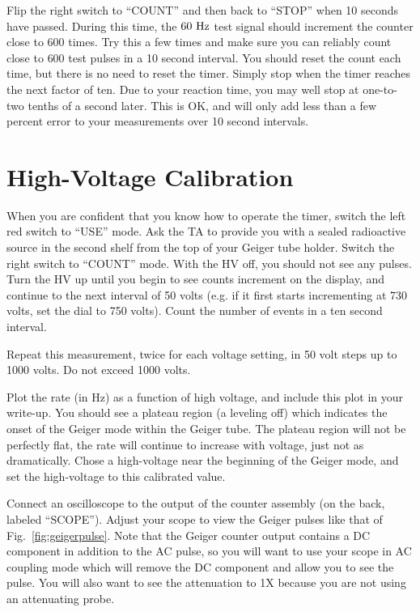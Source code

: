 \documentclass[12pt]{article}
\begin{document}
Flip the right switch to ``COUNT'' and then back to ``STOP'' when 10
seconds have passed.  During this time, the $60~\rm Hz$ test signal
should increment the counter close to 600 times.  Try this a few times
and make sure you can reliably count close to $600$ test pulses in a
10 second interval.  You should reset the count each time, but there
is no need to reset the timer.  Simply stop when the timer reaches the
next factor of ten.  Due to your reaction time, you may well stop at
one-to-two tenths of a second later.  This is OK, and will only add
less than a few percent error to your measurements over 10 second
intervals.

\section{High-Voltage Calibration}

When you are confident that you know how to operate the timer, switch
the left red switch to ``USE'' mode.  Ask the TA to provide you with a
sealed radioactive source in the second shelf from the top of your
Geiger tube holder.  Switch the right switch to ``COUNT'' mode.  With
the HV off, you should not see any pulses.  Turn the HV up until you
begin to see counts increment on the display, and continue to the next
interval of 50 volts (e.g. if it first starts incrementing at 730
volts, set the dial to 750 volts).  Count the number of events in a
ten second interval.

Repeat this measurement, twice for each voltage setting, in 50 volt
steps up to 1000 volts.  Do not exceed 1000 volts.

Plot the rate (in Hz) as a function of high voltage, and include this plot in your write-up.  You should see a plateau region (a leveling off) which indicates the onset of the Geiger mode within the Geiger tube.   The plateau region will not be perfectly flat, the rate will continue to increase with voltage, just not as dramatically.  Chose a high-voltage near the beginning of the Geiger mode, and set the high-voltage to this calibrated value.

Connect an oscilloscope to the output of the counter assembly (on the
back, labeled ``SCOPE'').  Adjust your scope to view the Geiger pulses
like that of Fig.~\ref{fig:geigerpulse}.  Note that the Geiger counter
output contains a DC component in addition to the AC pulse, so you
will want to use your scope in AC coupling mode which will remove the
DC component and allow you to see the pulse.  You will also want to
see the attenuation to 1X because you are not using an attenuating
probe.  
\end{document}
